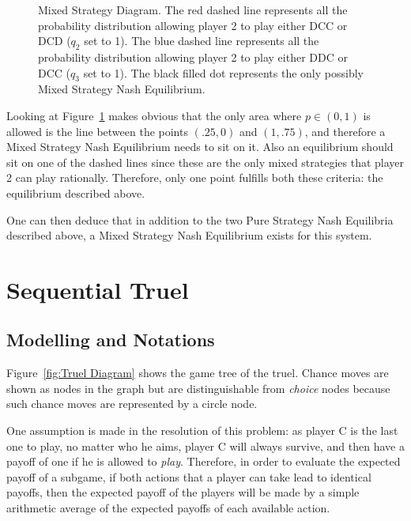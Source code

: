 \documentclass{article}
\begin{document}
\begin{figure}[!h]
\centering
{}
\caption{Mixed Strategy Diagram. The red dashed line represents all the probability distribution allowing
player 2 to play either DCC or DCD ($q_2$ set to 1). The blue dashed line represents all the probability
distribution allowing player 2 to play either DDC or DCC ($q_3$ set to 1). The black filled dot represents the only
possibly Mixed Strategy Nash Equilibrium.\label{fig:Mixed Strategy Diagram}}
\end{figure}

Looking at Figure~\ref{fig:Mixed Strategy Diagram} makes obvious that the only area where $p \in (0, 1)$ is allowed
is the line between the points $(.25, 0)$ and $(1, .75)$, and therefore a Mixed Strategy Nash Equilibrium needs to sit on it.
Also an equilibrium should sit on one of the dashed lines since these are the only mixed strategies that player 2 can
play rationally. Therefore, only one point fulfills both these criteria: the equilibrium described above.

One can then deduce that in addition to the two Pure Strategy Nash Equilibria described above, a Mixed Strategy Nash
Equilibrium exists for this system.

\section{Sequential Truel}
\subsection{Modelling and Notations}

Figure~\ref{fig:Truel Diagram} shows the game tree of the truel. Chance moves are shown as nodes in the graph but are
distinguishable from \textit{choice} nodes because such chance moves are represented by a circle node.

One assumption is made in the resolution of this problem: as player C is the last one to play, no matter who he aims,
player C will always survive, and then have a payoff of one if he is allowed to \textit{play}. Therefore, in order to
evaluate the expected payoff of a subgame, if both actions that a player can take lead to identical payoffs,
then the expected payoff of the players will be made by a simple arithmetic average of the expected payoffs of each
available action.
\end{document}
